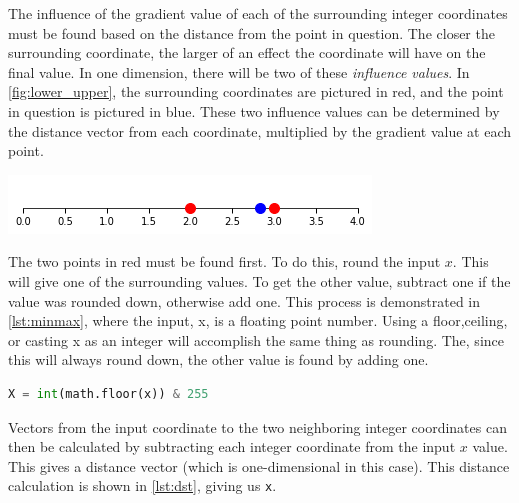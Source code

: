 \documentclass[10pt]{report}
\begin{document}
			The influence of the gradient value of each of the surrounding integer coordinates must be found based on the distance from the point in question. The closer the surrounding coordinate, the larger of an effect the coordinate will have on the final value. In one dimension, there will be two of these \emph{influence values}. In \autoref{fig:lower_upper}, the surrounding coordinates are pictured in red, and the point in question is pictured in blue. These two influence values can be determined by the distance vector from each coordinate, multiplied by the gradient value at each point. 
			
			\begin{minipage}{\textwidth}
				\centering
				\includegraphics[scale=0.75]{lower_upper}
				\label{fig:lower_upper}
			\end{minipage}
			
			The two points in red must be found first. To do this, round the input \(x\). This will give one of the surrounding values. To get the other value, subtract one if the value was rounded down, otherwise add one. This process is demonstrated in \autoref{lst:minmax}, where the input, x, is a floating point number. Using a floor,ceiling, or casting x as an integer will accomplish the same thing as rounding. The, since this will always round down, the other value is found by adding one. 
			
			\begin{lstlisting}[label={lst:minmax}, language=Python, frame=none, caption={An example of finding the min bounds in 1D Perlin noise, given input x. This implementation uses a floor function to calculate the minimum value, and an \lstinline|& 255| operation to ensure the X distance is eight-bits. This will be used in two and three dimensional implementations, for the hashing system.}, captionpos=b]
				X = int(math.floor(x)) & 255
			\end{lstlisting}
		
			Vectors from the input coordinate to the two neighboring integer coordinates can then be calculated by subtracting each integer coordinate from the input \(x\) value. This gives a distance vector (which is one-dimensional in this case). This distance calculation is shown in \autoref{lst:dst}, giving us \lstinline|x|. 
		
\end{document}
